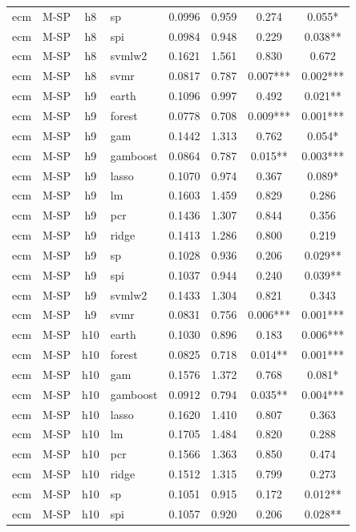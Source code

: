 \begin{ThreePartTable}
\begin{longtable}[t]{llclcccc}
ecm & M-SP & h8 & sp & 0.0996 & 0.959 & 0.274 & 0.055*\\
ecm & M-SP & h8 & spi & 0.0984 & 0.948 & 0.229 & 0.038**\\
ecm & M-SP & h8 & svmlw2 & 0.1621 & 1.561 & 0.830 & 0.672\\
ecm & M-SP & h8 & svmr & 0.0817 & 0.787 & 0.007*** & 0.002***\\
\addlinespace
ecm & M-SP & h9 & earth & 0.1096 & 0.997 & 0.492 & 0.021**\\
ecm & M-SP & h9 & forest & 0.0778 & 0.708 & 0.009*** & 0.001***\\
ecm & M-SP & h9 & gam & 0.1442 & 1.313 & 0.762 & 0.054*\\
ecm & M-SP & h9 & gamboost & 0.0864 & 0.787 & 0.015** & 0.003***\\
ecm & M-SP & h9 & lasso & 0.1070 & 0.974 & 0.367 & 0.089*\\
ecm & M-SP & h9 & lm & 0.1603 & 1.459 & 0.829 & 0.286\\
ecm & M-SP & h9 & pcr & 0.1436 & 1.307 & 0.844 & 0.356\\
ecm & M-SP & h9 & ridge & 0.1413 & 1.286 & 0.800 & 0.219\\
ecm & M-SP & h9 & sp & 0.1028 & 0.936 & 0.206 & 0.029**\\
ecm & M-SP & h9 & spi & 0.1037 & 0.944 & 0.240 & 0.039**\\
ecm & M-SP & h9 & svmlw2 & 0.1433 & 1.304 & 0.821 & 0.343\\
ecm & M-SP & h9 & svmr & 0.0831 & 0.756 & 0.006*** & 0.001***\\
\addlinespace
ecm & M-SP & h10 & earth & 0.1030 & 0.896 & 0.183 & 0.006***\\
ecm & M-SP & h10 & forest & 0.0825 & 0.718 & 0.014** & 0.001***\\
ecm & M-SP & h10 & gam & 0.1576 & 1.372 & 0.768 & 0.081*\\
ecm & M-SP & h10 & gamboost & 0.0912 & 0.794 & 0.035** & 0.004***\\
ecm & M-SP & h10 & lasso & 0.1620 & 1.410 & 0.807 & 0.363\\
ecm & M-SP & h10 & lm & 0.1705 & 1.484 & 0.820 & 0.288\\
ecm & M-SP & h10 & pcr & 0.1566 & 1.363 & 0.850 & 0.474\\
ecm & M-SP & h10 & ridge & 0.1512 & 1.315 & 0.799 & 0.273\\
ecm & M-SP & h10 & sp & 0.1051 & 0.915 & 0.172 & 0.012**\\
ecm & M-SP & h10 & spi & 0.1057 & 0.920 & 0.206 & 0.028**\\

\end{longtable}
\end{ThreePartTable}
